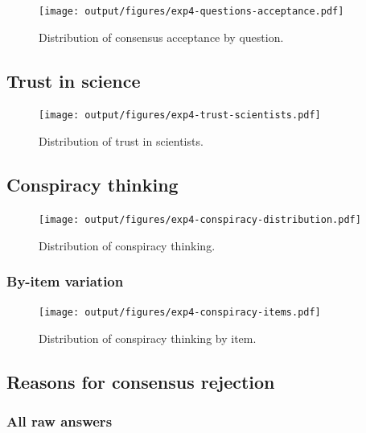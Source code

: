\documentclass[
  doc,floatsintext]{apa6}
\begin{document}
\begin{figure}
\centering
\texttt{[image: output/figures/exp4-questions-acceptance.pdf]}
\caption{\label{fig:exp4-questions-acceptance}Distribution of consensus acceptance by question.}
\end{figure}

\subsection{Trust in science}\label{trust-in-science-10}



\begin{figure}
\centering
\texttt{[image: output/figures/exp4-trust-scientists.pdf]}
\caption{\label{fig:exp4-trust-scientists}Distribution of trust in scientists.}
\end{figure}

\subsection{Conspiracy thinking}\label{conspiracy-thinking-4}



\begin{figure}
\centering
\texttt{[image: output/figures/exp4-conspiracy-distribution.pdf]}
\caption{\label{fig:exp4-conspiracy-distribution}Distribution of conspiracy thinking.}
\end{figure}

\subsubsection{By-item variation}\label{by-item-variation-3}



\begin{figure}
\centering
\texttt{[image: output/figures/exp4-conspiracy-items.pdf]}
\caption{\label{fig:exp4-conspiracy-items}Distribution of conspiracy thinking by item.}
\end{figure}

\subsection{Reasons for consensus rejection}\label{reasons-for-consensus-rejection-2}

\subsubsection{All raw answers}\label{all-raw-answers-2}
\end{document}
